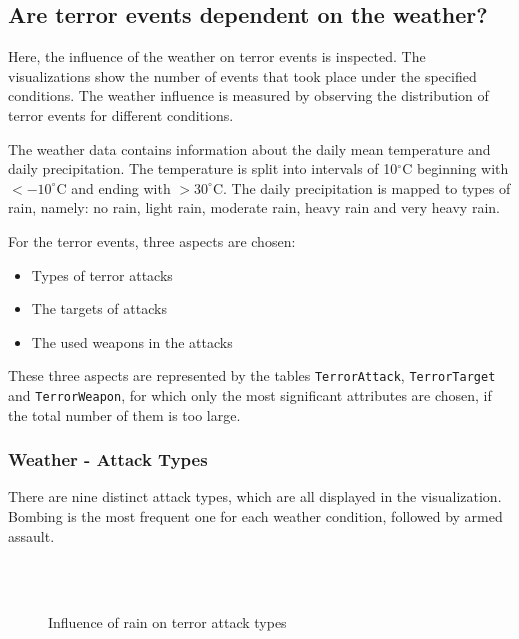 \subsection{Are terror events dependent on the weather?}
Here, the influence of the weather on terror events is inspected. The visualizations show the number of events that took place under the specified conditions. The weather influence is measured by observing the distribution of terror events for different conditions.

The weather data contains information about the daily mean temperature and daily precipitation. The temperature is split into intervals of 10$^\circ$C beginning with $< -10^\circ$C and ending with $> 30^\circ$C. The daily precipitation is mapped to types of rain, namely: no rain, light rain, moderate rain, heavy rain and very heavy rain.

For the terror events, three aspects are chosen:
\begin{itemize}
	\item Types of terror attacks
	\item The targets of attacks
	\item The used weapons in the attacks
\end{itemize}

These three aspects are represented by the tables \texttt{TerrorAttack}, \texttt{TerrorTarget} and \texttt{TerrorWeapon}, for which only the most significant attributes are chosen, if the total number of them is too large.

\newpage

\subsubsection{Weather - Attack Types}
There are nine distinct attack types, which are all displayed in the visualization. Bombing is the most frequent one for each weather condition, followed by armed assault.

\begin{figure}[!hbt]
\centering
    \qquad\\
    \qquad
    \qquad\\
    \qquad
\caption{Influence of rain on terror attack types}
\end{figure}


